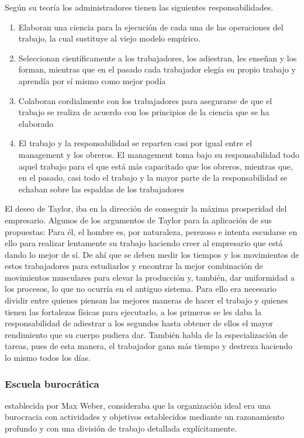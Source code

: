 \documentclass[titlepage,a4paper]{article}
\begin{document}
Según su teoría los administradores tienen las siguientes responsabilidades.
\begin{enumerate}
    \item Elaboran una ciencia para la ejecución de cada una de las operaciones del trabajo, la cual sustituye al viejo modelo empírico.
    \item Seleccionan científicamente a los trabajadores, los adiestran, les enseñan y los forman, mientras que en el pasado cada trabajador elegía su propio trabajo y aprendía por sí mismo como mejor podía
    \item Colaboran cordialmente con los trabajadores para asegurarse de que el trabajo se realiza de acuerdo con los principios de la ciencia que se ha elaborado 
    \item El trabajo y la responsabilidad se reparten casi por igual entre el management y los obreros. El management toma bajo su responsabilidad todo aquel trabajo para el que está más capacitado que los obreros, mientras que, en el pasado, casi todo el trabajo y la mayor parte de la responsabilidad se echaban sobre las espaldas de los trabajadores
\end{enumerate}

El deseo de Taylor, iba en la dirección de conseguir la máxima prosperidad del empresario. Algunos de los argumentos de Taylor para la aplicación de sus propuestas: Para él, el hombre es, por naturaleza, perezoso e intenta escudarse en ello para realizar lentamente su trabajo haciendo creer al empresario que está dando lo mejor de sí. De ahí que se deben medir los tiempos y los movimientos de estos trabajadores para estudiarlos y encontrar la mejor combinación de movimientos musculares para elevar la producción y, también, dar uniformidad a los procesos, lo que no ocurría en el antiguo sistema. Para ello era necesario dividir entre quienes piensan las mejores maneras de hacer el trabajo y quienes tienen las fortalezas físicas para ejecutarlo, a los primeros se les daba la responsabilidad de adiestrar a los segundos hasta obtener de ellos el mayor rendimiento que su cuerpo pudiera dar. También habla de la especialización de tareas, pues de esta manera, el trabajador gana más tiempo y destreza haciendo lo mismo todos los días.

\subsubsection*{Escuela burocrática}
establecida por Max Weber, consideraba que la organización ideal era una burocracia con actividades y objetivos establecidos mediante un razonamiento profundo y con una división de trabajo detallada explícitamente.
\end{document}
